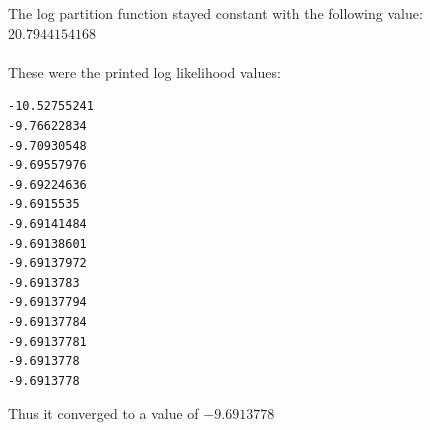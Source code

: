 \documentclass[twoside,11pt]{article}
\theoremstyle{definition}
\begin{document}
The log partition function stayed constant with the following value:\\
$20.7944154168$\\
\\
These were the printed log likelihood values: \\
\begin{lstlisting}
-10.52755241
-9.76622834
-9.70930548
-9.69557976
-9.69224636
-9.6915535
-9.69141484
-9.69138601
-9.69137972
-9.6913783
-9.69137794
-9.69137784
-9.69137781
-9.6913778
-9.6913778
\end{lstlisting}
Thus it converged to a value of $-9.6913778$
\end{document}
